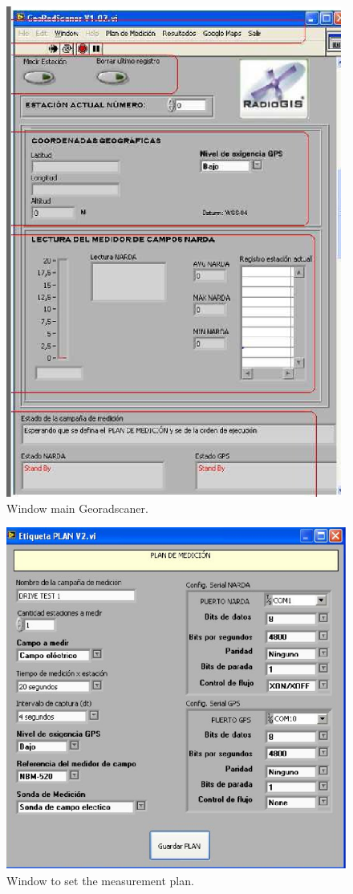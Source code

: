 \documentclass[xcolor=svgnames]{beamer}
\begin{document}
\begin{frame}
 \begin{figure}[H]
    \includegraphics[scale=0.32]{pro.png}
      \caption{Window main Georadscaner.}
    \end{figure}
\end{frame}

\begin{frame}
 \begin{figure}[H]
    \includegraphics[scale=0.315]{win.png}
      \caption{Window to set the measurement plan.}
    \end{figure}
\end{frame}
\end{document}
